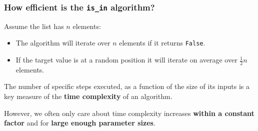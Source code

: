 \documentclass{beamer} %
\newcommand\emc[1]{\textcolor{midred}{\textbf{#1}}}
\begin{document}

\begin{frame}
\frametitle{How efficient is the \texttt{is\_in} algorithm?}

Assume the list has $n$ elements:
\begin{itemize}
\item The algorithm will iterate over $n$ elements if it returns \texttt{False}.
\item If the target value is at a random position it will iterate on average over $\frac{1}{2} n$ elements.
\end{itemize}

\vspace{5mm}
The number of specific steps executed, as a function of the size of its inputs is a key measure of the \emc{time complexity} of an algorithm.

\vspace{5mm}
However, we often only care about time complexity increases \emc{within a constant factor} and for \emc{large enough parameter sizes}.

\end{frame}
\end{document}
